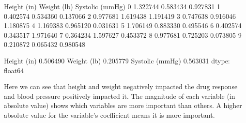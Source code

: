 \documentclass[letterpaper,10pt,english]{jupyterBook}
\begin{document}
\begin{sphinxVerbatim}[commandchars=\\\{\}]
        
\end{sphinxVerbatim}

\begin{sphinxVerbatim}[commandchars=\\\{\}]
   Height (in)  Weight (lb)  Systolic (mmHg)
0     1.322744    \PYGZhy{}0.583434        \PYGZhy{}0.927831
1    \PYGZhy{}0.402574     0.534360        \PYGZhy{}0.137066
2    \PYGZhy{}0.977681    \PYGZhy{}1.619438        \PYGZhy{}1.191419
3     0.747638     0.916046         1.180875
4    \PYGZhy{}1.169383    \PYGZhy{}0.965120        \PYGZhy{}0.031631
5     1.706149    \PYGZhy{}0.883330         0.495546
6    \PYGZhy{}0.402574     0.343517         1.971640
7     0.364234     1.597627        \PYGZhy{}0.453372
8    \PYGZhy{}0.977681     0.725203         0.073805
9    \PYGZhy{}0.210872    \PYGZhy{}0.065432        \PYGZhy{}0.980548
\end{sphinxVerbatim}

\begin{sphinxVerbatim}[commandchars=\\\{\}]
  
   
  \PYG{p}{[}\PYG{p}{]}
   
\end{sphinxVerbatim}

\begin{sphinxVerbatim}[commandchars=\\\{\}]
Height (in)       \PYGZhy{}0.506490
Weight (lb)       \PYGZhy{}0.205779
Systolic (mmHg)    0.563031
dtype: float64
\end{sphinxVerbatim}

\sphinxAtStartPar
Here we can see that height and weight negatively impacted the drug response and blood pressure positively impacted it.  The magnitude of each variable (in absolute value) shows which variables are more important than others.  A higher absolute value for the variable’s coefficient means it is more important.
\end{document}
